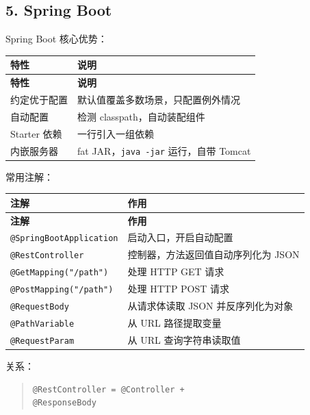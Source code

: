 \documentclass[UTF8,zihao=-4]{ctexart}
\begin{document}
\subsection{5. Spring Boot}

Spring Boot 核心优势：

{
\footnotesize
\begin{longtable}{|>{\raggedright\arraybackslash}p{}|>{\raggedright\arraybackslash}p{}|}
\hline
\textbf{特性} & \textbf{说明} \\
\hline
\endfirsthead
\hline
\textbf{特性} & \textbf{说明} \\
\hline
\endhead
约定优于配置 & 默认值覆盖多数场景，只配置例外情况 \\
\hline
自动配置 & 检测 classpath，自动装配组件 \\
\hline
Starter 依赖 & 一行引入一组依赖 \\
\hline
内嵌服务器 & fat JAR，\texttt{java -jar} 运行，自带 Tomcat \\
\hline
\end{longtable}
}


常用注解：

{
\footnotesize
\begin{longtable}{|>{\raggedright\arraybackslash}p{}|>{\raggedright\arraybackslash}p{}|}
\hline
\textbf{注解} & \textbf{作用} \\
\hline
\endfirsthead
\hline
\textbf{注解} & \textbf{作用} \\
\hline
\endhead
\texttt{@SpringBootApplication} & 启动入口，开启自动配置 \\
\hline
\texttt{@RestController} & 控制器，方法返回值自动序列化为 JSON \\
\hline
\texttt{@GetMapping("/path")} & 处理 HTTP GET 请求 \\
\hline
\texttt{@PostMapping("/path")} & 处理 HTTP POST 请求 \\
\hline
\texttt{@RequestBody} & 从请求体读取 JSON 并反序列化为对象 \\
\hline
\texttt{@PathVariable} & 从 URL 路径提取变量 \\
\hline
\texttt{@RequestParam} & 从 URL 查询字符串读取值 \\
\hline
\end{longtable}
}


关系：

\begin{quote}
\footnotesize
\begin{verbatim}
@RestController = @Controller + 
@ResponseBody
\end{verbatim}
\end{quote}
\end{document}
